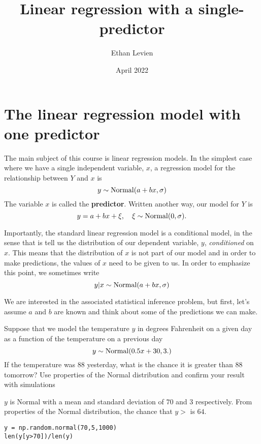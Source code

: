 

\title{\Huge \color{C1}  Linear regression with a single-predictor}
\author{Ethan Levien}
\date{April 2022}



\maketitle

\tableofcontents




\section{The linear regression model with one predictor}
The main subject of this course is linear regression models. In the simplest case where we have a single independent variable, $x$, a regression model for the relationship between $Y$ and  $x$ is 
\begin{equation}\label{eq:reg}
y \sim {\rm Normal}(a+ b x,\sigma)
\end{equation}
The variable $x$ is called the {\bf predictor}.  Written another way, our model for $Y$ is 
\begin{equation}
y =a+ bx + \xi,\quad \xi \sim {\rm Normal}(0,\sigma).
\end{equation}


Importantly, the standard linear regression model is a conditional model, in the sense that is tell us the distribution of our dependent variable, $y$, \emph{conditioned} on $x$. This means that the distribution of $x$ is not part of our model and in order to make predictions, the values of $x$ need to be given to us. In order to emphasize this point, we sometimes write 
\begin{equation}\label{eq:reg}
y|x \sim {\rm Normal}(a+ b x,\sigma)
\end{equation}

We are interested in the associated statistical inference problem, but first, let's assume $a$ and $b$ are known and think about some of the predictions we can make.  

\begin{example} Suppose that we model the temperature $y$ in degrees Fahrenheit on a given day as a function of the temperature on a previous day 
\begin{equation}
y \sim {\rm Normal}(0.5x+ 30,3.)
\end{equation}
If the temperature was $88$ yesterday, what is the chance it is greater than $88$ tomorrow? Use properties of the Normal distribution and confirm your result with simulations
\end{example}
\begin{solution}
$y$ is Normal with a mean and standard deviation of $70$ and $3$ respectively. From properties of the Normal distribution, the chance that $y>$ is $64$. 
\begin{Verbatim}
y = np.random.normal(70,5,1000)
len(y[y>70])/len(y)
\end{Verbatim}
\end{solution}



